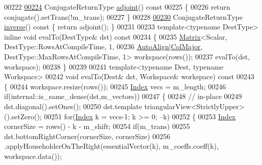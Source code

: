 \begin{DoxyCode}
00222 
\hyperlink{group___householder___module_a40ca81cf392d8de4c747dbbdd6bd6545}{00224}     ConjugateReturnType \hyperlink{group___householder___module_a40ca81cf392d8de4c747dbbdd6bd6545}{adjoint}()\textcolor{keyword}{ const}
00225 \textcolor{keyword}{    }\{
00226       \textcolor{keywordflow}{return} conjugate().setTrans(!m\_trans);
00227     \}
00228 
\hyperlink{group___householder___module_af030b5ac2151241aeb920f74e8f73b4a}{00230}     ConjugateReturnType \hyperlink{group___householder___module_af030b5ac2151241aeb920f74e8f73b4a}{inverse}()\textcolor{keyword}{ const }\{ \textcolor{keywordflow}{return} adjoint(); \}
00231 
00233     \textcolor{keyword}{template}<\textcolor{keyword}{typename} DestType> \textcolor{keyword}{inline} \textcolor{keywordtype}{void} evalTo(DestType& dst)\textcolor{keyword}{ const}
00234 \textcolor{keyword}{    }\{
00235       \hyperlink{group___core___module_class_eigen_1_1_matrix}{Matrix}<Scalar, DestType::RowsAtCompileTime, 1,
00236              \hyperlink{group__enums_ggaacded1a18ae58b0f554751f6cdf9eb13a28d63c0dd8560827162decfd898804f4}{AutoAlign}|\hyperlink{group__enums_ggaacded1a18ae58b0f554751f6cdf9eb13a0cbd4bdd0abcfc0224c5fcb5e4f6669a}{ColMajor}, DestType::MaxRowsAtCompileTime, 1> workspace(rows());
00237       evalTo(dst, workspace);
00238     \}
00239 
00241     \textcolor{keyword}{template}<\textcolor{keyword}{typename} Dest, \textcolor{keyword}{typename} Workspace>
00242     \textcolor{keywordtype}{void} evalTo(Dest& dst, Workspace& workspace)\textcolor{keyword}{ const}
00243 \textcolor{keyword}{    }\{
00244       workspace.resize(rows());
00245       \hyperlink{group___core___module_a554f30542cc2316add4b1ea0a492ff02}{Index} vecs = m\_length;
00246       \textcolor{keywordflow}{if}(internal::is\_same\_dense(dst,m\_vectors))
00247       \{
00248         \textcolor{comment}{// in-place}
00249         dst.diagonal().setOnes();
00250         dst.template triangularView<StrictlyUpper>().setZero();
00251         \textcolor{keywordflow}{for}(\hyperlink{group___core___module_a554f30542cc2316add4b1ea0a492ff02}{Index} k = vecs-1; k >= 0; --k)
00252         \{
00253           \hyperlink{group___core___module_a554f30542cc2316add4b1ea0a492ff02}{Index} cornerSize = rows() - k - m\_shift;
00254           \textcolor{keywordflow}{if}(m\_trans)
00255             dst.bottomRightCorner(cornerSize, cornerSize)
00256                .applyHouseholderOnTheRight(essentialVector(k), m\_coeffs.coeff(k), workspace.data());

\end{DoxyCode}
